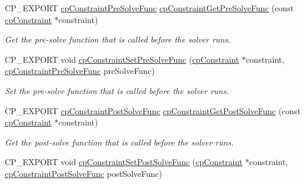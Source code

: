 \begin{DoxyCompactItemize}
\mbox{\label{group__cpConstraint_ga7d42a75c670eb34e590f66b7a2de70f9}} 
C\+P\+\_\+\+E\+X\+P\+O\+RT \hyperlink{group__cpConstraint_gaf6038a155d58f45d6ab977dd1b1398de}{cp\+Constraint\+Pre\+Solve\+Func} \hyperlink{group__cpConstraint_ga7d42a75c670eb34e590f66b7a2de70f9}{cp\+Constraint\+Get\+Pre\+Solve\+Func} (const \hyperlink{structcpConstraint}{cp\+Constraint} $\ast$constraint)
\begin{DoxyCompactList}\small\item\em Get the pre-\/solve function that is called before the solver runs. \end{DoxyCompactList}\item 
\mbox{\label{group__cpConstraint_gac2dfaa821d91dc3e0ad4c31568e92c8c}} 
C\+P\+\_\+\+E\+X\+P\+O\+RT void \hyperlink{group__cpConstraint_gac2dfaa821d91dc3e0ad4c31568e92c8c}{cp\+Constraint\+Set\+Pre\+Solve\+Func} (\hyperlink{structcpConstraint}{cp\+Constraint} $\ast$constraint, \hyperlink{group__cpConstraint_gaf6038a155d58f45d6ab977dd1b1398de}{cp\+Constraint\+Pre\+Solve\+Func} pre\+Solve\+Func)
\begin{DoxyCompactList}\small\item\em Set the pre-\/solve function that is called before the solver runs. \end{DoxyCompactList}\item 
\mbox{\label{group__cpConstraint_gab7bad11fece5dc9349626227925e4438}} 
C\+P\+\_\+\+E\+X\+P\+O\+RT \hyperlink{group__cpConstraint_ga2208378297a7265d0cc69f31697961b9}{cp\+Constraint\+Post\+Solve\+Func} \hyperlink{group__cpConstraint_gab7bad11fece5dc9349626227925e4438}{cp\+Constraint\+Get\+Post\+Solve\+Func} (const \hyperlink{structcpConstraint}{cp\+Constraint} $\ast$constraint)
\begin{DoxyCompactList}\small\item\em Get the post-\/solve function that is called before the solver runs. \end{DoxyCompactList}\item 
\mbox{\label{group__cpConstraint_ga37730c4854e0803955b1b29cafa005d6}} 
C\+P\+\_\+\+E\+X\+P\+O\+RT void \hyperlink{group__cpConstraint_ga37730c4854e0803955b1b29cafa005d6}{cp\+Constraint\+Set\+Post\+Solve\+Func} (\hyperlink{structcpConstraint}{cp\+Constraint} $\ast$constraint, \hyperlink{group__cpConstraint_ga2208378297a7265d0cc69f31697961b9}{cp\+Constraint\+Post\+Solve\+Func} post\+Solve\+Func)

\end{DoxyCompactItemize}

